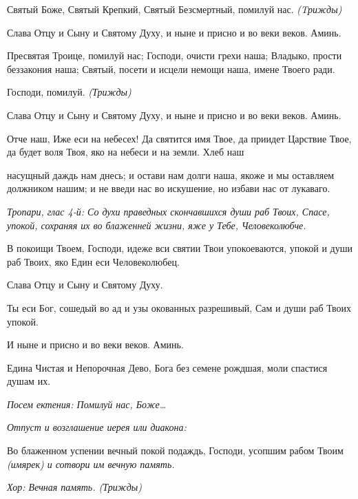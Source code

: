    Святый Боже, Святый Крепкий, Святый Безсмертный, помилуй нас. \itshape 
(Tрижды)\normalfont{}


   Слава Отцу и Сыну и Святому Духу, и ныне и присно и во веки веков.
Аминь.


   Пресвятая Троице, помилуй нас; Господи, очисти грехи наша; Владыко,
прости беззакония наша; Святый, посети и исцели немощи наша, имене
Твоего ради.


   Господи, помилуй. \itshape  (Трижды)\normalfont{}


   Слава Отцу и Сыну и Святому Духу, и ныне и присно и во веки веков.
Аминь.


   Отче наш, Иже еси на небесех! Да святится имя Твое, да приидет
Царствие Твое, да будет воля Твоя, яко на небеси и на земли. Хлеб наш

насущный даждь нам днесь; и остави нам долги наша, якоже и мы оставляем
должником нашим; и не введи нас во искушение, но избави нас от
лукаваго.


 \itshape Тропари, глас 4-й:\normalfont{} Со духи праведных скончавшихся души раб
Твоих, Спасе, упокой, сохраняя их во блаженней жизни, яже у Тебе,
Человеколюбче.


   В покоищи Твоем, Господи, идеже вси святии Твои упокоеваются, упокой
и души раб Твоих, яко Един еси Человеколюбец.


   Слава Отцу и Сыну и Святому Духу.


   Ты еси Бог, сошедый во ад и узы окованных разрешивый, Сам и души
раб Твоих упокой.


   И ныне и присно и во веки веков. Аминь.


   Едина Чистая и Непорочная Дево, Бога без семене рождшая, моли
спастися душам их.


 \itshape Посем ектения:\normalfont{} Помилуй нас, Боже…


 \itshape Отпуст и возглашение иерея или диакона:\normalfont{}


   Во блаженном успении вечный покой подаждь, Господи, усопшим рабом
Твоим \itshape (имярек)\normalfont{} и сотвори им вечную память.


 \itshape  Хор:\normalfont{} Вечная память. (\itshape  Трижды\normalfont{})

   

\mychapterending

 
 

